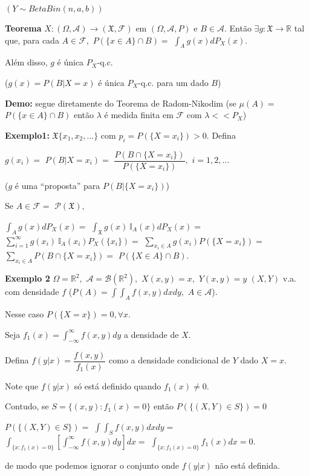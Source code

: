 \documentclass[
]{book}
\begin{document}
\((Y \sim Beta Bin (n,a,b))\)

\textbf{Teorema} \(X: (\Omega,\mathcal{A}) \longrightarrow (\mathfrak{X},\mathcal{F})\) em \((\Omega,\mathcal{A},P)\) e \(B \in \mathcal{A}.\) Então \(\exists g:\mathfrak{X} \longrightarrow \mathbb{R}\) tal que, para cada \(A \in \mathcal{F},\) \(P(\{x\in A\}\cap B)=\) \(\int_Ag(x)dP_X(x).\)

Além disso, \(g\) é única \(P_X\)-q.c.

(\(g(x)=P(B|X=x)\) é única \(P_X\)-q.c. para um dado \(B\))

\textbf{Demo:} segue diretamente do Teorema de Radom-Nikodim (se \(\mu(A)=\) \(P(\{x\in A\}\cap B)\) então \(\lambda\) é medida finita em \(\mathcal{F}\) com \(\lambda << P_X\))

\textbf{Exemplo1:} \(\mathfrak{X}\{x_1,x_2,\ldots\}\) com \(p_i=P(\{X=x_i\})>0.\) Defina

\(g(x_i)=\) \(P(B|X=x_i)=\) \(\dfrac{P(B\cap \{X=x_i\})}{P(\{X=x_i\})},\) \(i=1,2,\ldots\)

(\(g\) é uma ``proposta'' para \(P(B|\{X=x_i\})\))

Se \(A \in \mathcal{F}=\) \(\mathcal{P}(\mathfrak{X}),\)

\(\int_A g(x)dP_X(x)=\) \(\int_{\mathfrak{X}}g(x)~\mathbb{I}_A(x)dP_X(x)=\) \(\sum_{i=1}^\infty g(x_i)~\mathbb{I}_A(x_i)P_X(\{x_i\})=\) \(\sum_{x_i \in A}g(x_i)P(\{X=x_i\})=\) \(\sum_{x_i \in A}P(B \cap \{X=x_i\})=\) \(P(\{X\in A\}\cap B).\)

\textbf{Exemplo 2} \(\Omega=\mathbb{R}^2,\) \(\mathcal{A}= \mathcal{B}(\mathbb{R}^2),\) \(X(x,y)=x,\) \(Y(x,y)=y\) \((X,Y)\) v.a. com densidade \(f\) (\(P(A)=\int \int_A f(x,y)dxdy,\) \(A \in \mathcal{A}\)).

Nesse caso \(P(\{X=x\})=0, \forall x.\)

Seja \(f_1(x)=\int_{-\infty}^{\infty} f(x,y)dy\) a densidade de \(X\).

Defina \(f(y|x)=\dfrac{f(x,y)}{f_1(x)}\) como a densidade condicional de \(Y\) dado \(X=x.\)

Note que \(f(y|x)\) só está definido quando \(f_1(x) \neq 0.\)

Contudo, se \(S=\{(x,y): f_1(x)=0\}\) então \(P(\{(X,Y)\in S\})=0\)

\(P(\{(X,Y)\in S\})=\) \(\int \int_S f(x,y)dxdy=\) \(\int_{\{x:f_1(x)=0\}}\left[\int_{-\infty}^\infty f(x,y)dy\right]dx=\) \(\int_{\{x:f_1(x)=0\}} f_1(x)dx=0.\)

de modo que podemos ignorar o conjunto onde \(f(y|x)\) não está definida.
\end{document}
